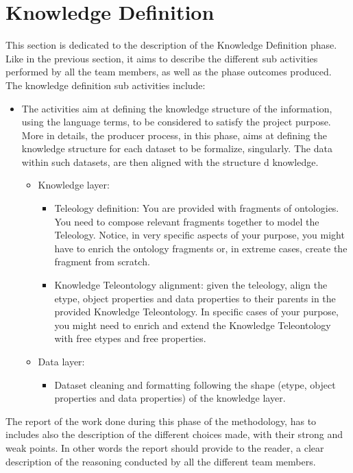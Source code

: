 \section{Knowledge Definition}
This section is dedicated to the description of the Knowledge Definition phase. Like in the previous section, it aims to describe the different sub activities performed by all the team members, as well as the phase outcomes produced. The knowledge definition sub activities include:
\begin{itemize}
    \item The activities aim at defining the knowledge structure of the information, using the language terms, to be considered to satisfy the project purpose. More in details, the producer process, in this phase, aims at defining the knowledge structure for each dataset to be formalize, singularly. The data within such datasets, are then aligned with the structure d knowledge.
    
    \begin{itemize}
        \item Knowledge layer:
        \begin{itemize}
            \item Teleology definition: You are provided with fragments of ontologies. You need to compose relevant fragments together to model the Teleology. Notice, in very specific aspects of your purpose, you might have to enrich the ontology fragments or, in extreme cases, create the fragment from scratch.
            \item Knowledge Teleontology alignment: given the teleology, align the etype, object properties and data properties to their parents in the provided Knowledge Teleontology. In specific cases of your purpose, you might need to enrich and extend the Knowledge Teleontology with free etypes and free properties.
        \end{itemize}
        \item Data layer:
        \begin{itemize}
            \item Dataset cleaning and formatting following the shape (etype, object properties and data properties) of the knowledge layer.
        \end{itemize}
    \end{itemize}
\end{itemize}

\noindent The report of the work done during this phase of the methodology, has to includes also the description of the  different choices made, with their strong and weak points. In other words the report should provide to the reader, a clear description of the reasoning conducted by all the different team members.

